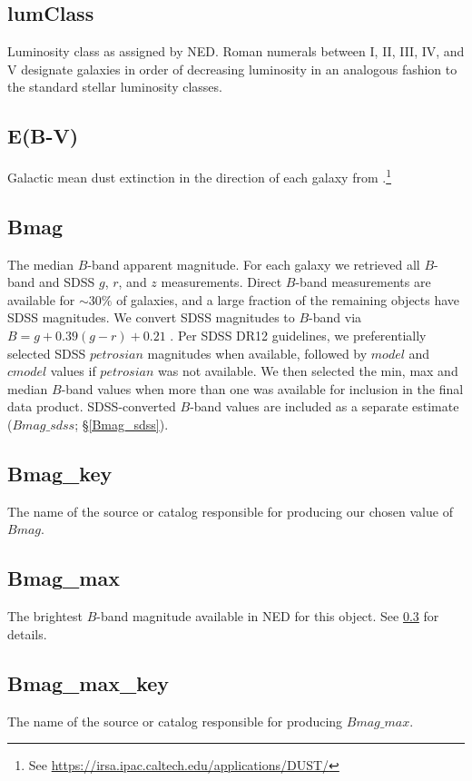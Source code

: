 \documentclass[twocolumn,tighten]{aastex62}
\begin{document}
\subsection{lumClass} \label{lumClass}
Luminosity class as assigned by NED. Roman numerals between I, II, III, IV, and V designate galaxies in order of decreasing luminosity in an analogous fashion to the standard stellar luminosity classes.

\subsection{E(B-V)} \label{E(B-V)}
Galactic mean dust extinction in the direction of each galaxy from \cite{schlafly2011}.\footnote{See \url{https://irsa.ipac.caltech.edu/applications/DUST/}}


\subsection{Bmag} \label{Bmag}
The median $B$-band apparent magnitude. For each galaxy we retrieved all $B$-band and SDSS $g$, $r$, and $z$ measurements. Direct $B$-band measurements are available for $\sim 30\%$ of galaxies, and a large fraction of the remaining objects have SDSS magnitudes. We convert SDSS magnitudes to $B$-band via $B = g + 0.39 (g-r) + 0.21$ \citep{jester2005}. Per SDSS DR12 guidelines, we preferentially selected SDSS $petrosian$ magnitudes when available, followed by $model$ and $cmodel$ values if $petrosian$ was not available. We then selected the min, max and median $B$-band values when more than one was available for inclusion in the final data product. SDSS-converted $B$-band values are included as a separate estimate ($Bmag\_sdss$; \S \ref{Bmag_sdss}). 

\subsection{Bmag\_key} \label{Bmag_key}
The name of the source or catalog responsible for producing our chosen value of $Bmag$.

\subsection{Bmag\_max}
The brightest $B$-band magnitude available in NED for this object. See \ref{Bmag} for details.

\subsection{Bmag\_max\_key}
The name of the source or catalog responsible for producing $Bmag\_max$.
\end{document}

